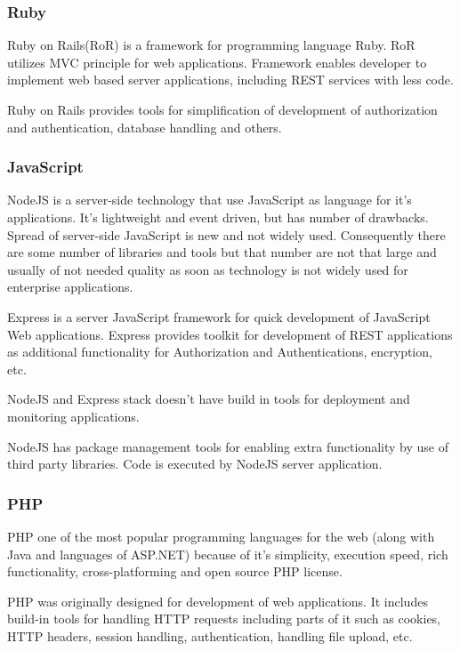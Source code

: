 \documentclass[thesis=M,english]{FITthesis}[2012/10/20]
\begin{document}
\subsubsection{Ruby}

Ruby on Rails(RoR) is a framework for programming language Ruby. RoR utilizes MVC principle for web applications. Framework enables developer to implement web based server applications, including REST services with less code.

Ruby on Rails provides tools for simplification of development of authorization and authentication, database handling and others.

\subsubsection{JavaScript}

NodeJS is a server-side technology that use JavaScript as language for it's applications. It's lightweight and event driven, but has number of drawbacks. Spread of server-side JavaScript is new and not widely used. Consequently there are some number of libraries and tools but that number are not that large and usually of not needed quality as soon as technology is not widely used for enterprise applications.

Express is a server JavaScript framework for quick development of JavaScript Web applications. Express provides toolkit for development of REST applications as additional functionality for Authorization and Authentications, encryption, etc.

NodeJS and Express stack doesn't have build in tools for deployment and monitoring applications.

NodeJS has package management tools for enabling extra functionality by use of third party libraries.
Code is executed by NodeJS server application.


\subsubsection{PHP}

PHP one of the most popular programming languages for the web (along with Java and languages of ASP.NET) because of it's simplicity, execution speed, rich functionality, cross-platforming and open source PHP license.

PHP was originally designed for development of web applications. It includes build-in tools for handling HTTP requests including parts of it such as cookies, HTTP headers, session handling, authentication, handling file upload, etc.
\end{document}
